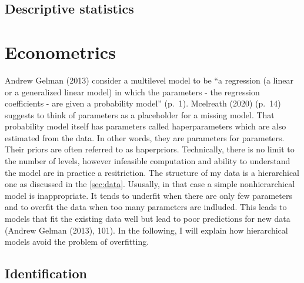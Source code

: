 \documentclass[a4, 12pt]{article}
\begin{document}
\hypertarget{descriptive-statistics}{%
\subsection{Descriptive statistics}\label{descriptive-statistics}}

\label{descriptives}

\clearpage

\hypertarget{econometrics}{%
\section{Econometrics}\label{econometrics}}

\label{sec:econometrics}
Andrew Gelman (2013) consider a multilevel model to be ``a regression (a linear or a generalized linear model) in which the parameters - the regression coefficients - are given a probability model'' (p.~1). Mcelreath (2020) (p.~14) suggests to think of parameters as a placeholder for a missing model. That probability model itself has parameters called haperparameters which are also estimated from the data. In other words, they are parameters for parameters. Their priors are often referred to as haperpriors. Technically, there is no limit to the number of levels, however infeasible computation and ability to understand the model are in practice a resitriction. The structure of my data is a hierarchical one as discussed in the \ref{sec:data}. Ususally, in that case a simple nonhierarchical model is inappropriate. It tends to underfit when there are only few parameters and to overfit the data when too many parameters are indluded. This leads to models that fit the existing data well but lead to poor predictions for new data (Andrew Gelman (2013), 101). In the following, I will explain how hierarchical models avoid the problem of overfitting.

\hypertarget{identification}{%
\subsection{Identification}\label{identification}}
\end{document}
